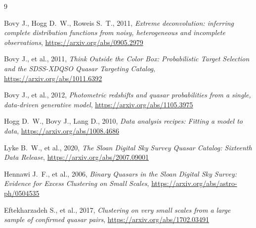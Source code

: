 \documentclass[11pt,a4paper]{article}
\begin{document}
\begin{thebibliography}{9}

Bovy J., Hogg D.~W., Roweis S.~T., 2011,
\emph{Extreme deconvolution: inferring complete distribution functions from
noisy, heterogeneous and incomplete observations},
\url{https://arxiv.org/abs/0905.2979}

Bovy J., et al., 2011,
\emph{Think Outside the Color Box: Probabilistic Target Selection and the
SDSS-XDQSO Quasar Targeting Catalog},
\url{https://arxiv.org/abs/1011.6392}

Bovy J., et al., 2012,
\emph{Photometric redshifts and quasar probabilities from a single, data-driven
generative model},
\url{https://arxiv.org/abs/1105.3975}

Hogg D.~W., Bovy J., Lang D., 2010,
\emph{Data analysis recipes: Fitting a model to data},
\url{https://arxiv.org/abs/1008.4686}

Lyke B.~W., et al., 2020,
\emph{The Sloan Digital Sky Survey Quasar Catalog: Sixteenth Data Release},
\url{https://arxiv.org/abs/2007.09001}

Hennawi J.~F., et al., 2006,
\emph{Binary Quasars in the Sloan Digital Sky Survey: Evidence for Excess
Clustering on Small Scales},
\url{https://arxiv.org/abs/astro-ph/0504535}

Eftekharzadeh S., et al., 2017,
\emph{Clustering on very small scales from a large sample of confirmed quasar
pairs},
\url{https://arxiv.org/abs/1702.03491}

\end{thebibliography}
\end{document}
